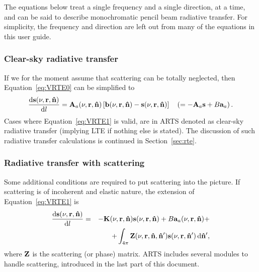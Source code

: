 The equations below treat a single frequency and a single direction,
at a time, and can be said to describe monochromatic pencil beam radiative
transfer. For simplicity, the frequency and direction are left out from many of
the equations in this user guide.

\subsubsection{Clear-sky radiative transfer}
%
If we for the moment assume that scattering can be totally neglected, then
Equation~\ref{eq:VRTE0} can be simplified to
\begin{equation}
  \label{eq:VRTE1}
  \frac{\mathrm{d}{\bf s}(\nu,{\bf r},{\bf \hat{n}})}{\mathrm{d} l} =
  {\bf A}_{a}(\nu,{\bf r},{\bf \hat{n}})\left[ {\bf b}(\nu,{\bf r},{\bf \hat{n}})- 
  {\bf s}(\nu,{\bf r},{\bf \hat{n}})\right] \quad 
  \left( = -{\bf A}_{a}{\bf s} + B{\bf a}_{a}\right).
\end{equation}
Cases where Equation~\ref{eq:VRTE1} is valid, are in ARTS denoted as clear-sky
radiative transfer (implying LTE if nothing else is stated). The discussion of
such radiative transfer calculations is continued in Section~\ref{sec:rte}.


\subsubsection{Radiative transfer with scattering}
%
Some additional conditions are required to put scattering into the picture. If
scattering is of incoherent and elastic nature, the extension of 
Equation~\ref{eq:VRTE1} is
\begin{eqnarray}
  \label{eq:VRTE2}
  \frac {\mathrm{d}{\bf s}(\nu,{\bf r},{\bf \hat{n}})}{\mathrm{d} l} &=&
    -{\bf K}(\nu,{\bf r},{\bf \hat{n}}) {\bf s}(\nu,{\bf r},{\bf \hat{n}}) +
     B{\bf a}_{a}(\nu,{\bf r},{\bf \hat{n}}) + \\ \nonumber
    &&+ \int_{4\pi} {\bf Z}(\nu,{\bf r},{\bf \hat{n}},{\bf \hat{n}}')
    {\bf s}(\nu,{\bf r},{\bf \hat{n}}')\,\mathrm{d}{\bf \hat{n}}' ,
\end{eqnarray}
where ${\bf Z}$ is the scattering (or phase) matrix.  ARTS includes several
modules to handle scattering, introduced in the last part of this document.\\






